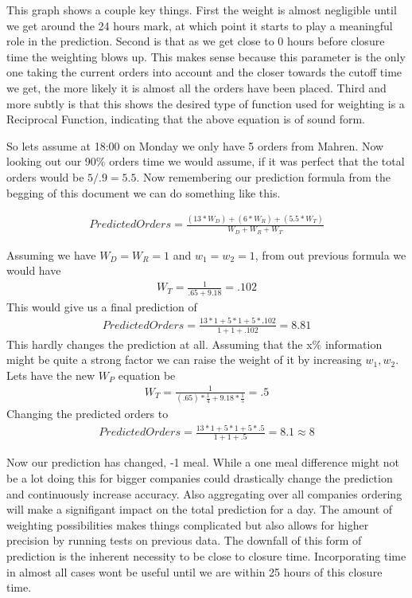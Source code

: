 \documentclass[12pt]{article}
\newcommand{\ban}[1]{ \begin{align*}#1\end{align*} }
\begin{document}
\begin{center}
\end{center}

This graph shows a couple key things. First the weight is almost negligible until we get around the 24 hours mark, at which point it starts to play a meaningful role in the prediction. Second is that as we get close to 0 hours before closure time the weighting blows up. This makes sense because this parameter is the only one taking the current orders into account and the closer towards the cutoff time we get, the more likely it is almost all the orders have been placed. Third and more subtly is that this shows the desired type of function used for weighting is a Reciprocal Function, indicating that the above equation is of sound form. 

So lets assume at 18:00 on Monday we only have 5 orders from Mahren. Now looking out our 90\% orders time we would assume, if it was perfect that the total orders would be $5/.9=5.5$. Now remembering our prediction formula from the begging of this document we can do something like this.

\ban{
PredictedOrders = \frac{(13*W_D)+(6*W_R)+(5.5*W_T)}{W_D+W_R+W_T}}

Assuming we have $W_D=W_R=1$ and $w_1=w_2=1$, from out previous formula we would have
\ban{W_T=\frac{1}{.65+9.18}=.102}
This would give us a final prediction of 
\ban{PredictedOrders = \frac{13*1+5*1+5*.102}{1+1+.102}=8.81}
This hardly changes the prediction at all. Assuming that the x\% information might be quite a strong factor we can raise the weight of it by increasing $w_1,w_2$. Lets have the new $W_P$ equation be
\ban{W_T = \frac{1}{(.65)*\frac{1}{4}+9.18*\frac{1}{5}} = .5}
Changing the predicted orders to
\ban{PredictedOrders = \frac{13*1+5*1+5*.5}{1+1+.5}=8.1\approx 8}

Now our prediction has changed, -1 meal. While a one meal difference might not be a lot doing this for bigger companies could drastically change the prediction and continuously increase accuracy. Also aggregating over all companies ordering will make a signifigant impact on the total prediction for a day. The amount of weighting possibilities makes things complicated but also allows for higher precision by running tests on previous data. The downfall of this form of prediction is the inherent necessity to be close to closure time. Incorporating time in almost all cases wont be useful until we are within 25 hours of this closure time. 
\end{document}
